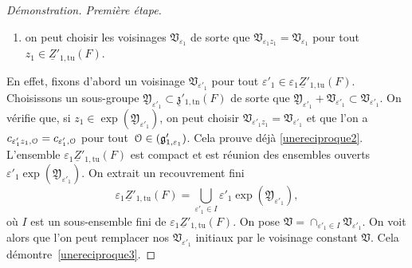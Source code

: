 \documentclass[11pt]{article}
\numberwithin{equation}{section}\providecommand{\og}{«\,}\providecommand{\fg}{\,»}
\let\mathcal \EuScript
\newcommand{\NoChangel}[1]{%
\expandafter\let\csname old\string#1\endcsname=#1
\let#1=\relax
\newcommand{#1}{\mathcode`l="716C\csname old\string#1\endcsname\mathcode`l="7160 }%
}
\let\epsilon\varepsilon
\newcommand{\frg}{\mathfrak{g}}
\newcommand{\frz}{\mathfrak{z}}
\newcommand{\frV}{\mathfrak{V}}
\newcommand{\frY}{\mathfrak{Y}}
\newcommand{\Nil}{\mathrm{Nil}} \NoChangel{\Nil}
\newcommand{\tn}{\mathrm{tn}}
\newcommand{\tu}{\mathrm{tu}}
\newcommand{\cO}{\mathcal{O}}
\theoremstyle{plain}
\theoremstyle{definition}
\renewcommand{\proofname}{Démonstration}
\begin{document}
\begin{proof}[\proofname. Première étape]
\begin{enumerate}
\item\label{unereciproque3}
on peut choisir les voisinages $\frV_{\epsilon_{1}}$ de sorte que $\frV_{\epsilon_{1}z_{1}}\!=\!\frV_{\epsilon_{1}}$ pour tout $z_{1}\!\in\!\underline{Z}'_{1,\tu}(F)$.
\end{enumerate}

En effet, fixons d'abord un voisinage $\frV_{\epsilon'_{1}}$ pour tout $\epsilon'_{1}\in \epsilon_{1}\underline{Z}'_{1,\tu}(F)$.
Choisissons un sous-groupe $\frY_{\epsilon'_{1}}\subset \underline{\frz}'_{1,\tn}(F)$ de sorte que $\frY_{\epsilon'_{1}}+\frV_{\epsilon'_{1}}\subset \frV_{\epsilon'_{1}}$. On vérifie que, si $z_{1}\in \exp(\frY_{\epsilon'_{1}}) $, on peut choisir $\frV_{\epsilon'_{1}z_{1}}=\frV_{\epsilon'_{1}}$ et que l'on a
$c_{\epsilon'_{1}z_{1},\cO}=c_{\epsilon'_{1},\cO}$ pour tout~$\cO\in \Nil(\frg'_{1,\epsilon_{1}})$. Cela prouve déjà \eqref{unereciproque2}. L'ensemble $\epsilon_{1}\underline{Z}'_{1,\tu}(F)$ est compact et est réunion des ensembles ouverts $\epsilon'_{1}\exp(\frY_{\epsilon'_{1}})$. On extrait un recouvrement fini
\[
\epsilon_{1}\underline{Z}'_{1,\tu}(F)=\bigcup_{\epsilon'_{1}\in I}\epsilon'_{1}\exp(\frY_{\epsilon'_{1}}),
\]
où $I$ est un sous-ensemble fini de $\epsilon_{1}\underline{Z}'_{1,\tu}(F)$. On pose $\frV=\cap_{\epsilon'_{1}\in I}\frV_{\epsilon'_{1}}$. On voit alors que l'on peut remplacer nos $\frV_{\epsilon'_{1}}$ initiaux par le voisinage constant $\frV$. Cela démontre~\eqref{unereciproque3}.


\end{proof}
\end{document}
